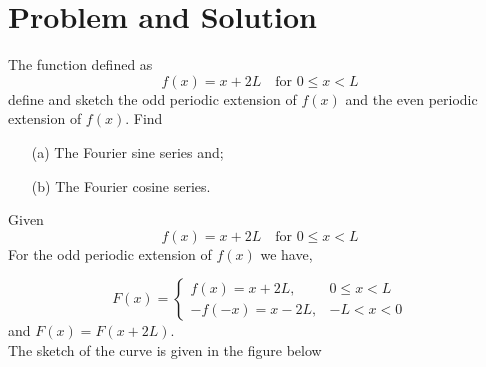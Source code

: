 \documentclass[12pt]{scrartcl}
\begin{document}

	\section{Problem and Solution} 
\label{sec:2}
	\begin{ques}
	The function defined as 
	\[
	f(x) = x + 2L \quad \text{for $0 \le x < L$}
\]
	define and sketch the odd periodic extension of $f(x)$ and the even periodic extension of $f(x)$. Find 
	\begin{itemize}
	\item[(a)] The Fourier sine series and;
	\item[(b)] The Fourier cosine series.
\end{itemize}
\end{ques}
\begin{soln}
	Given 
	\[
	f(x) = x + 2L \quad \text{for $0 \le x < L$}
\] 
For the odd periodic extension of $f(x)$ we have,

\begin{equation*}
	F(x) = \begin{cases}
	f(x) = x + 2L, & 0 \le x < L \\
	-f(-x) = x - 2L, & -L < x < 0
\end{cases}
\end{equation*}
and $F(x) = F(x+ 2L)$. \\
The sketch of the curve is given in the figure below\\


\end{soln}
\end{document}
